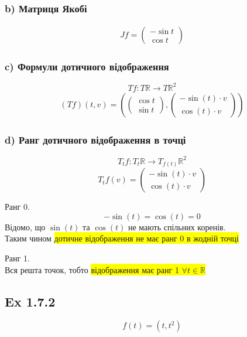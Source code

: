 \documentclass[10pt, a4paper]{article} %
\newcommand{\R}{\mathbb{R}}
\begin{document}
\subsubsection*{b) Матриця Якобі}
\begin{align*}
    Jf = \begin{pmatrix}
        -\sin t \\ \cos t
    \end{pmatrix}
\end{align*}

\subsubsection*{c) Формули дотичного відображення}
\[Tf : T\R \to T\R^2\]
\begin{align*}
    (Tf)(t, v) = \left(\begin{pmatrix}
        \cos t \\ \sin t
    \end{pmatrix}, \begin{pmatrix}
        -\sin(t) \cdot v \\ \cos(t) \cdot v
    \end{pmatrix}\right)
\end{align*}

\subsubsection*{d) Ранг дотичного відображення в точці}
\[T_{t}f: T_{t}\R \to T_{f(t)}\R^2\]
\[T_{t}f(v) = \begin{pmatrix}
    -\sin(t) \cdot v \\ \cos(t) \cdot v
\end{pmatrix}\]

Ранг 0.
\[-\sin(t) = \cos(t) = 0\]
Відомо, що $\sin(t)$ та $\cos(t)$ не мають спільних коренів. \\
Таким чином \colorbox{yellow}{дотичне відображення не має ранг 0 в жодній точці}

Ранг 1.\\
Вся решта точок, тобто \colorbox{yellow}{відображення має ранг 1 $\forall t \in \R$}


\subsection*{Ex 1.7.2}
\[f(t) = (t, t^2)\]
\end{document}
